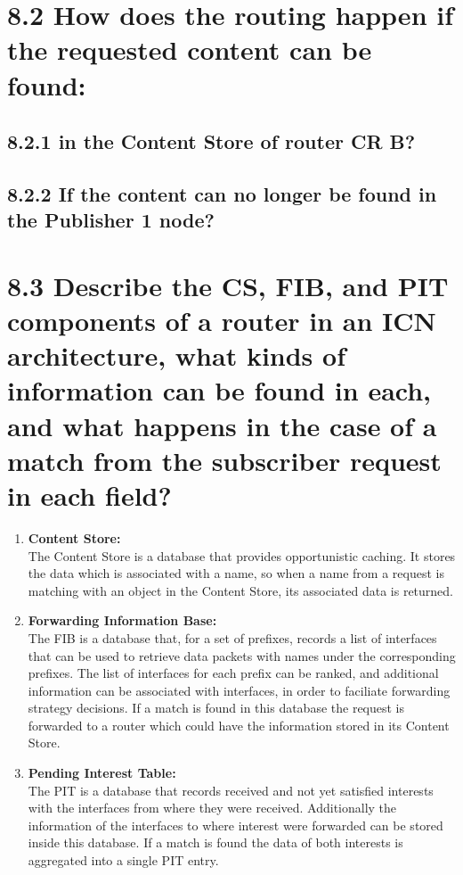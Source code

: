 \documentclass{article}
\begin{document}
	\section*{8.2 How does the routing happen if the requested content can be found:}
	\begin{adjustwidth}{2em}{2em}
		\subsection*{8.2.1 in the Content Store of router CR B?}
		\begin{adjustwidth}{2em}{2em}
		\end{adjustwidth}
		\subsection*{8.2.2 If the content can no longer be found in the Publisher 1 node?}
		\begin{adjustwidth}{2em}{2em}
		\end{adjustwidth}
	\end{adjustwidth}
	
	\section*{8.3 Describe the CS, FIB, and PIT components of a router in an ICN architecture, what kinds of information can be found in each, and what happens in the case of a match from the subscriber request in each field?}
	\begin{adjustwidth}{2em}{2em}
		\begin{enumerate}[\small \textbullet]
			\item \textbf{Content Store:} \\
			The Content Store is a database that provides opportunistic caching. It stores the data which is associated with a name, so when a name from a request is matching with an object in the Content Store, its associated data is returned.
			\item \textbf{Forwarding Information Base:} \\
			The FIB is a database that, for a set of prefixes, records a list of interfaces that can be used to retrieve data packets with names under the corresponding prefixes. The list of interfaces for each prefix can be ranked, and additional information can be associated with interfaces, in order to faciliate forwarding strategy decisions. If a match is found in this database the request is forwarded to a router which could have the information stored in its Content Store.
			\item \textbf{Pending Interest Table:} \\
			The PIT is a database that records received and not yet satisfied interests with the interfaces from where they were received. Additionally the information of the interfaces to where interest were forwarded can be stored inside this database. If a match is found the data of both interests is aggregated into a single PIT entry.
		\end{enumerate}
	\end{adjustwidth}
	
\end{document}
